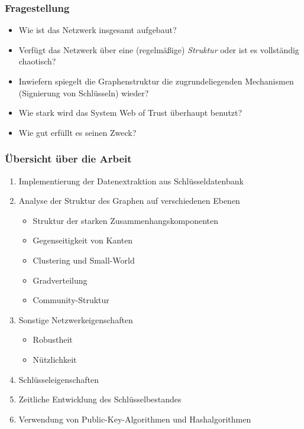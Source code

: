 \documentclass[10pt]{beamer}
\begin{document}
\begin{frame}
  \frametitle{Fragestellung}
  \begin{itemize}
  \item Wie ist das Netzwerk insgesamt aufgebaut?
  \item Verf\"ugt das Netzwerk \"uber eine (regelm\"a{\ss}ige)
    \emph{Struktur} oder ist es vollst\"andig chaotisch?
  \item Inwiefern spiegelt die Graphenstruktur die zugrundeliegenden
    Mechanismen (Signierung von Schl\"usseln) wieder?
  \item Wie stark wird das System Web of Trust \"uberhaupt benutzt?
  \item Wie gut erf\"ullt es seinen Zweck?
  \end{itemize}
\end{frame}

\begin{frame}
  \frametitle{\"Ubersicht \"uber die Arbeit}
  \begin{enumerate}
  \item Implementierung der Datenextraktion aus Schl\"usseldatenbank
  \item Analyse der Struktur des Graphen auf verschiedenen Ebenen
    \begin{itemize}
    \item Struktur der starken Zusammenhangskomponenten
    \item Gegenseitigkeit von Kanten
    \item Clustering und Small-World
    \item Gradverteilung
    \item Community-Struktur
    \end{itemize}
  \item Sonstige Netzwerkeigenschaften
    \begin{itemize}
    \item Robustheit
    \item N\"utzlichkeit
    \end{itemize}
  \item Schl\"usseleigenschaften
    \item Zeitliche Entwicklung des Schl\"usselbestandes
    \item Verwendung von Public-Key-Algorithmen und Hashalgorithmen
  \end{enumerate}
\end{frame}
\end{document}

